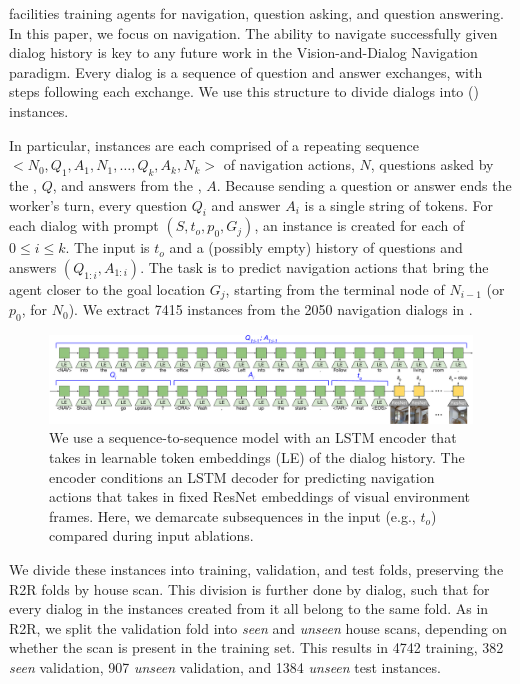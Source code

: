 
\dataset{} facilities training agents for navigation, question asking, and question answering.
In this paper, we focus on navigation.
The ability to navigate successfully given dialog history is key to any future work in the Vision-and-Dialog Navigation paradigm.
Every dialog is a sequence of \nav{} question and \ora{} answer exchanges, with \nav{} steps following each exchange.
We use this structure to divide dialogs into \taskfull{} (\task{}) instances.

In particular, \dataset{} instances are each comprised of a repeating sequence ${<N_0, Q_1, A_1, N_1, \dots, Q_k, A_k, N_k>}$ of navigation actions, $N$, questions asked by the \nav{}, $Q$, and answers from the \ora{}, $A$.
Because sending a question or answer ends the worker's turn, every question $Q_i$ and answer $A_i$ is a single string of tokens.
For each dialog with prompt $(S, t_o, p_0, G_j)$, an \task{} instance is created for each of $0\leq i\leq k$.
The input is $t_o$ and a (possibly empty) history of questions and answers $(Q_{1:i}, A_{1:i})$.
The task is to predict navigation actions that bring the agent closer to the goal location $G_j$, starting from the terminal node of $N_{i-1}$ (or $p_0$, for $N_0$).
We extract 7415 \task{} instances from the 2050 navigation dialogs in \dataset{}.

\begin{figure}[ht]
\centering
\includegraphics[width=1.\columnwidth]{figures/model.pdf}
\caption{We use a sequence-to-sequence model with an LSTM encoder that takes in learnable token embeddings (LE) of the dialog history.
The encoder conditions an LSTM decoder for predicting navigation actions that takes in fixed ResNet embeddings of visual environment frames.
Here, we demarcate subsequences in the input (e.g., $t_o$) compared during input ablations.
}
\label{fig:model}
\vspace{-3mm}
\end{figure}

We divide these instances into training, validation, and test folds, preserving the R2R folds by house scan.
This division is further done by dialog, such that for every dialog in \dataset{} the \task{} instances created from it all belong to the same fold.
As in R2R, we split the validation fold into \textit{seen} and \textit{unseen} house scans, depending on whether the scan is present in the training set. This results in 4742 training, 382 \textit{seen} validation, 907 \textit{unseen} validation, and 1384 \textit{unseen} test instances.

